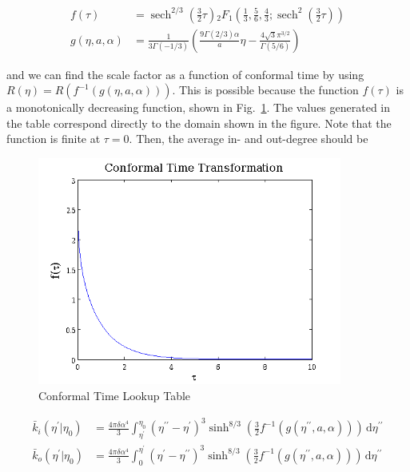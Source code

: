 \documentclass[preprint,notitlepage,amsmath,amssymb,floatfix]{revtex4-1}
\DeclareMathOperator{\sech}{sech}
\begin{document}
\begin{align}
f\left(\tau\right) &= \sech^{2/3}\left(\frac{3}{2}\tau\right) {}_2F_1\left(\frac{1}{3},\frac{5}{6},\frac{4}{3};\sech^2\left(\frac{3}{2}\tau\right)\right) \\
g\left(\eta, a, \alpha\right) &= \frac{1}{3\Gamma\left(-1/3\right)}\left(\frac{9\Gamma\left(2/3\right)\alpha}{a}\eta - \frac{4\sqrt{3}\pi^{3/2}}{\Gamma\left(5/6\right)}\right)
\end{align}

\noindent and we can find the scale factor as a function of conformal time by using $R\left(\eta\right) = R\left(f^{-1}\left(g\left(\eta, a, \alpha\right)\right)\right)$.
This is possible because the function $f\left(\tau\right)$ is a monotonically decreasing function, shown in Fig.~\ref{fig:f_tau_tau}.
The values generated in the table correspond directly to the domain shown in the figure.
Note that the function is finite at $\tau = 0$.
Then, the average in- and out-degree should be

\begin{figure}
\includegraphics[width=10cm]{figures/ctuc.png}
\caption{Conformal Time Lookup Table}
\label{fig:f_tau_tau}
\centering
\end{figure}

\begin{align}
\bar{k}_i\left(\eta^\prime|\eta_0\right) &= \frac{4\pi\delta\alpha^4}{3}\int_{\eta^\prime}^{\eta_0}\!\left(\eta^{\prime\prime}-\eta^\prime\right)^3\sinh^{8/3}\left(\frac{3}{2}f^{-1}\left(g\left(\eta^{\prime\prime}, a, \alpha\right)\right)\right)\,\mathrm d\eta^{\prime\prime} \\
\bar{k}_o\left(\eta^\prime|\eta_0\right) &= \frac{4\pi\delta\alpha^4}{3}\int_0^{\eta^\prime}\!\left(\eta^\prime-\eta^{\prime\prime}\right)^3\sinh^{8/3}\left(\frac{3}{2}f^{-1}\left(g\left(\eta^{\prime\prime}, a, \alpha\right)\right)\right)\,\mathrm d\eta^{\prime\prime}
\end{align}
\end{document}
